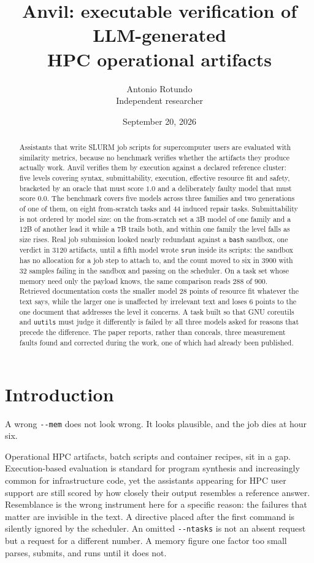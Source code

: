 \documentclass[11pt,a4paper]{article}
\title{Anvil: executable verification of LLM-generated\\HPC operational artifacts}
\author{Antonio Rotundo\\
  \small Independent researcher}
\date{September 20, 2026}
\begin{document}
\maketitle

\begin{abstract}
Assistants that write SLURM job scripts for supercomputer users are evaluated with similarity
metrics, because no benchmark verifies whether the artifacts they produce actually work. Anvil
verifies them by execution against a declared reference cluster: five levels covering syntax,
submittability, execution, effective resource fit and safety, bracketed by an oracle that must
score $1.0$ and a deliberately faulty model that must score $0.0$. The benchmark covers five
models across three families and two generations of one of them, on eight from-scratch tasks and
$44$ induced repair tasks. Submittability is not ordered by model size: on the from-scratch set a
3B model of one family and a 12B of another lead it while a 7B trails both, and within one family
the level falls as size rises. Real job submission looked nearly redundant against a \texttt{bash}
sandbox, one verdict in $3120$ artifacts, until a fifth model wrote \texttt{srun} inside its
scripts: the sandbox has no allocation for a job step to attach to, and the count moved to six in
$3900$ with $32$ samples failing in the sandbox and passing on the scheduler. On a task set whose
memory need only the payload knows, the same comparison reads $288$ of $900$. Retrieved
documentation costs the smaller model $28$ points of resource fit whatever the text says, while
the larger one is unaffected by irrelevant text and loses $6$ points to the one document that
addresses the level it concerns. A task built so that GNU coreutils and \texttt{uutils} must judge
it differently is failed by all three models asked for reasons that precede the difference. The
paper reports, rather than conceals, three measurement faults found and corrected during the work,
one of which had already been published.
\end{abstract}

\section{Introduction}

A wrong \verb|--mem| does not look wrong. It looks plausible, and the job dies at hour six.

Operational HPC artifacts, batch scripts and container recipes, sit in a gap. Execution-based
evaluation is standard for program synthesis and increasingly common for infrastructure code, yet
the assistants appearing for HPC user support are still scored by how closely their output
resembles a reference answer. Resemblance is the wrong instrument here for a specific reason: the
failures that matter are invisible in the text. A directive placed after the first command is
silently ignored by the scheduler. An omitted \verb|--ntasks| is not an absent request but a
request for a different number. A memory figure one factor too small parses, submits, and runs
until it does not.
\end{document}
